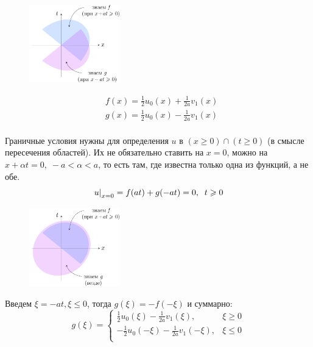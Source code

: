 \documentclass[../main.tex]{subfiles}
\begin{document}
\begin{figure}
    \centering
    \includegraphics[width=0.35\textwidth]{./pic 4_1.pdf}
\end{figure}

\begin{align*}
    & f(x) = \frac{1}{2}u_0(x) + \frac{1}{2a}v_1(x) \\
    & g(x) = \frac{1}{2}u_0(x) - \frac{1}{2a}v_1(x) \\
\end{align*}

Граничные условия нужны для определения $u$ в $(x \geq 0)\cap(t \geq 0)$ (в смысле пересечения областей). Их не обязательно ставить на $x=0$, можно на $x + \alpha t = 0, \; -a < \alpha < a$, то есть там, где известна только одна из функций, а не обе.
$$
\left. u\right|_{x=0} = f(at) + g(-at)=0, \;\; t \geqslant 0
$$
\clearpage %

\begin{figure}
    \includegraphics[width=0.35\textwidth]{./pic 4_2.pdf}
\end{figure}

Введем $\xi = -at, \xi \leq 0$, тогда $g(\xi) = -f(-\xi)$ и суммарно:
\begin{equation*}
    g(\xi) = \begin{cases}
        \frac{1}{2}u_0(\xi)-\frac{1}{2a}v_1(\xi), & \xi \geq 0\\
        -\frac{1}{2}u_0(-\xi)-\frac{1}{2a}v_1(-\xi), & \xi \leq 0\\
    \end{cases}
\end{equation*}
\end{document}

